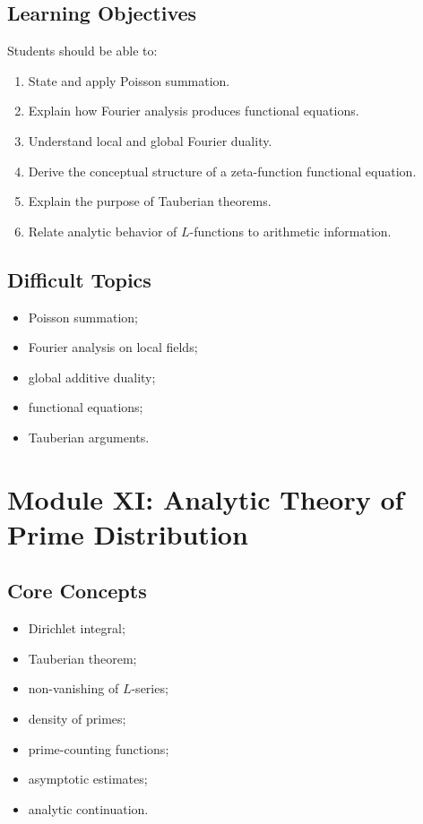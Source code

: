 \documentclass[11pt,a4paper]{article}
\begin{document}
\subsection{Learning Objectives}

Students should be able to:

\begin{enumerate}
    \item State and apply Poisson summation.
    \item Explain how Fourier analysis produces functional equations.
    \item Understand local and global Fourier duality.
    \item Derive the conceptual structure of a zeta-function
    functional equation.
    \item Explain the purpose of Tauberian theorems.
    \item Relate analytic behavior of \(L\)-functions to arithmetic
    information.
\end{enumerate}

\subsection{Difficult Topics}

\begin{itemize}
    \item Poisson summation;
    \item Fourier analysis on local fields;
    \item global additive duality;
    \item functional equations;
    \item Tauberian arguments.
\end{itemize}

\section{Module XI: Analytic Theory of Prime Distribution}

\subsection{Core Concepts}

\begin{itemize}
    \item Dirichlet integral;
    \item Tauberian theorem;
    \item non-vanishing of \(L\)-series;
    \item density of primes;
    \item prime-counting functions;
    \item asymptotic estimates;
    \item analytic continuation.
\end{itemize}
\end{document}
